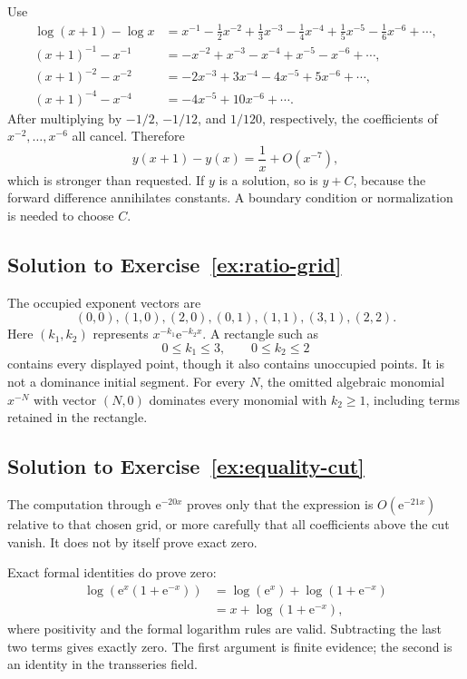 \documentclass[11pt,oneside]{book}
\theoremstyle{definition}
\theoremstyle{remark}
\newcommand{\e}{\mathrm{e}}
\newcommand{\bigO}{O}
\begin{document}
Use
\begin{align*}
  \log(x+1)-\log x
  &=x^{-1}-\frac12x^{-2}+\frac13x^{-3}
    -\frac14x^{-4}+\frac15x^{-5}-\frac16x^{-6}+\cdots,\\
  (x+1)^{-1}-x^{-1}
  &=-x^{-2}+x^{-3}-x^{-4}+x^{-5}-x^{-6}+\cdots,\\
  (x+1)^{-2}-x^{-2}
  &=-2x^{-3}+3x^{-4}-4x^{-5}+5x^{-6}+\cdots,\\
  (x+1)^{-4}-x^{-4}
  &=-4x^{-5}+10x^{-6}+\cdots.
\end{align*}
After multiplying by $-1/2$, $-1/12$, and $1/120$, respectively, the
coefficients of $x^{-2},\ldots,x^{-6}$ all cancel. Therefore
\[
  y(x+1)-y(x)=\frac1x+\bigO(x^{-7}),
\]
which is stronger than requested. If $y$ is a solution, so is $y+C$, because the
forward difference annihilates constants. A boundary condition or normalization
is needed to choose $C$.

\subsection*{Solution to Exercise~\ref{ex:ratio-grid}}

The occupied exponent vectors are
\[
  (0,0),(1,0),(2,0),
  (0,1),(1,1),(3,1),(2,2).
\]
Here $(k_1,k_2)$ represents
$x^{-k_1}\e^{-k_2x}$. A rectangle such as
\[
  0\le k_1\le3,
  \qquad0\le k_2\le2
\]
contains every displayed point, though it also contains unoccupied points. It is
not a dominance initial segment. For every $N$, the omitted algebraic monomial
$x^{-N}$ with vector $(N,0)$ dominates every monomial with $k_2\ge1$, including
terms retained in the rectangle.

\subsection*{Solution to Exercise~\ref{ex:equality-cut}}

The computation through $\e^{-20x}$ proves only that the expression is
$\bigO(\e^{-21x})$ relative to that chosen grid, or more carefully that all
coefficients above the cut vanish. It does not by itself prove exact zero.

Exact formal identities do prove zero:
\begin{align*}
  \log\left(\e^x(1+\e^{-x})\right)
  &=\log(\e^x)+\log(1+\e^{-x})\\
  &=x+\log(1+\e^{-x}),
\end{align*}
where positivity and the formal logarithm rules are valid. Subtracting the last
two terms gives exactly zero. The first argument is finite evidence; the second
is an identity in the transseries field.
\end{document}
